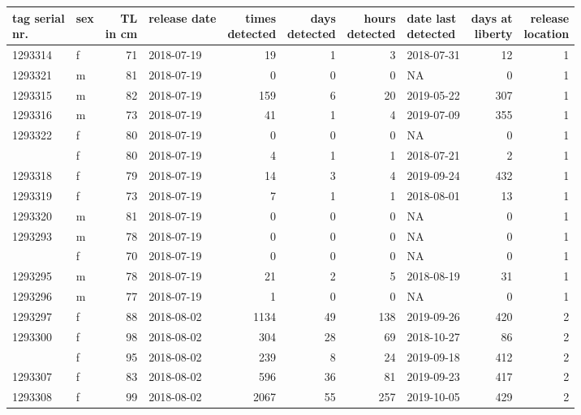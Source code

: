 \documentclass[
  authoryear,
  review,
  3p]{elsarticle}
\begin{document}
\begin{table}[H]
\centering
\begin{tabular}{llrlrrrlrr}
\toprule
\makecell[c]{tag serial\\nr.} & sex & \makecell[c]{TL\\ in cm} & release date & \makecell[c]{times\\detected} & \makecell[c]{days\\detected} & \makecell[c]{hours\\detected} & \makecell[c]{date last\\detected} & \makecell[c]{days at\\liberty} & \makecell[c]{release\\location}\\
\midrule
1293314 & f & 71 & 2018-07-19 & 19 & 1 & 3 & 2018-07-31 & 12 & 1\\
1293321 & m & 81 & 2018-07-19 & 0 & 0 & 0 & NA & 0 & 1\\
1293315 & m & 82 & 2018-07-19 & 159 & 6 & 20 & 2019-05-22 & 307 & 1\\
1293316 & m & 73 & 2018-07-19 & 41 & 1 & 4 & 2019-07-09 & 355 & 1\\
1293322 & f & 80 & 2018-07-19 & 0 & 0 & 0 & NA & 0 & 1\\
\addlinespace
1293317 & f & 80 & 2018-07-19 & 4 & 1 & 1 & 2018-07-21 & 2 & 1\\
1293318 & f & 79 & 2018-07-19 & 14 & 3 & 4 & 2019-09-24 & 432 & 1\\
1293319 & f & 73 & 2018-07-19 & 7 & 1 & 1 & 2018-08-01 & 13 & 1\\
1293320 & m & 81 & 2018-07-19 & 0 & 0 & 0 & NA & 0 & 1\\
1293293 & m & 78 & 2018-07-19 & 0 & 0 & 0 & NA & 0 & 1\\
\addlinespace
1293294 & f & 70 & 2018-07-19 & 0 & 0 & 0 & NA & 0 & 1\\
1293295 & m & 78 & 2018-07-19 & 21 & 2 & 5 & 2018-08-19 & 31 & 1\\
1293296 & m & 77 & 2018-07-19 & 1 & 0 & 0 & NA & 0 & 1\\
1293297 & f & 88 & 2018-08-02 & 1134 & 49 & 138 & 2019-09-26 & 420 & 2\\
1293300 & f & 98 & 2018-08-02 & 304 & 28 & 69 & 2018-10-27 & 86 & 2\\
\addlinespace
1293298 & f & 95 & 2018-08-02 & 239 & 8 & 24 & 2019-09-18 & 412 & 2\\
1293307 & f & 83 & 2018-08-02 & 596 & 36 & 81 & 2019-09-23 & 417 & 2\\
1293308 & f & 99 & 2018-08-02 & 2067 & 55 & 257 & 2019-10-05 & 429 & 2\\

\end{tabular}
\end{table}
\end{document}

